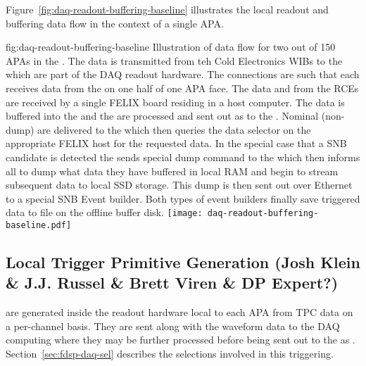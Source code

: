 
Figure~\ref{fig:daq-readout-buffering-baseline} illustrates the local
readout and buffering data flow in the context of a single APA.  

\begin{dunefigure}{fig:daq-readout-buffering-baseline}
  {Illustration of data flow for two out of 150 APAs in the 
    . 
    The data is transmitted from teh Cold Electronics WIBs to the
     which are part of the  DAQ 
    readout hardware. 
    The connections are such that each  receives data from
    the  on one half of one APA face.
    The data and  from the RCEs are received by
    a single FELIX board residing in a host computer. 
    The data is buffered into the  and the
     are processed and sent out as
     to the .
    Nominal (non-dump)  are delivered to the
     which then queries the data selector on the appropriate
    FELIX host for the requested data.
    In the special case that a SNB candidate is detected the
     sends special dump command to the  which
    then informs all  to dump what data they have buffered
    in local RAM and begin to stream subsequent data to local SSD
    storage.
    This dump is then sent out over Ethernet to a special SNB Event
    builder. 
    Both types of event builders finally save triggered data to file
    on the offline buffer disk.
    }  
  \texttt{[image: daq-readout-buffering-baseline.pdf]}%
\end{dunefigure}


\subsection{Local Trigger Primitive Generation (Josh Klein \& J.J. Russel \& Brett Viren \& DP Expert?)}
\label{sec:fdsp-daq-ltp}


 are generated inside the  readout
hardware local to each APA from TPC data on a per-channel basis.
They are sent along with the waveform data to the  DAQ
computing where they may be further processed before being sent out to
the  as .  
Section~\ref{sec:fdsp-daq-sel} describes the selections involved in
this triggering.

